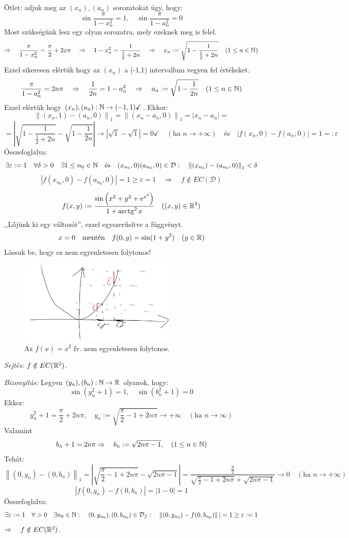 \documentclass[a4paper,11.5pt]{article}
\DeclareMathOperator{\arctg}{arc tg}
\newcommand{\norm}[1]{\left\lVert#1\right\rVert}
\begin{document}
\begin{task}
		Ötlet: adjuk meg az $(x_n),(a_n)$ sorozatokat úgy, hogy:
		\[ \sin\frac{\pi}{1-x_n^2}=1,\quad \sin\frac{\pi}{1-a_n^2}=0 \]
		Most szükségünk lesz egy olyan sorozatra, mely ezeknek meg is felel.
		\[ \Rightarrow\quad \frac{\pi}{1-x_n^2}=\frac{\pi}{2}+2x\pi \quad \Rightarrow\quad 1-x_n^2=\frac{1}{\frac{1}{2}+2n}\quad \Rightarrow\quad x_n:=\sqrt{1-\frac{1}{\frac{1}{2}+2n}}\quad (1\leq n\in\mathbb{N})  \]
		Ezzel sikeresen elértük hogy az $(x_n)$ a (-1,1) intervallum vegyen fel értékeket.
		\[ \frac{\pi}{1-a_n^2}=2n\pi\quad \Rightarrow\quad \frac{1}{2n}=1-a_n^2\quad \Rightarrow\quad a_n:=\sqrt{1-\frac{1}{2n}}\quad (1\leq n\in\mathbb{N}) \]
		Ezzel elértük hogy $(x_n),(a_n):\mathbb{N}\to(-1,1)\checkmark$. Ekkor:
		\[ \norm{(x_n,1)-(a_n,0)}_1=\norm{(x_n-a_n,0)}_1=|x_n-a_n|=\]
		\[=\left|\sqrt{1-\frac{1}{\frac{1}{2}+2n}}-\sqrt{1-\frac{1}{2n}}\right|\to|\sqrt{1}-\sqrt{1}|=0\checkmark\quad (\text{ha } n\to+\infty )\quad \text{és}\quad |f(x_n,0)-f(a_n,0)|=1=:\varepsilon \]
		Összefoglalva:
		\[ \exists\varepsilon:=1\quad \forall\delta>0\quad \exists1\leq n_0\in\N\quad \text{és}\quad (x_{n_0},0)(a_{n_0},0)\in \mathcal{D}:\quad \norm{(x_{n_0})-(a_{n_0},0)}_1<\delta\]
		\[ |f(x_{n_0},0)-f(a_{n_0},0)|=1 \geq\varepsilon=1\quad \Rightarrow\quad f\notin EC(\mathcal{D}) \]
		
	\end{task}
	\begin{task}
		\[ f(x,y):=\frac{\sin\left(x^2+y^2+e^{x^4}\right)}{1+\arctg^2x}\quad ((x,y)\in\R^2) \]
		,,Lőjünk ki egy változót'', ezzel egyszerűsítve a függvényt.
		\[ x=0\quad \text{mentén}\quad f(0,y)=\sin(1+y^2)\quad (y\in\mathbb{R}) \]
		Lássuk be, hogy ez nem egyenletesen folytonos!
		
		\begin{figure}[H]
			\centering
			\includegraphics[height=4cm]{../2zh/kepek/54.png}
			\caption{Az $f(x)=x^2$ fv. nem egyenletesen folytonos.}
		\end{figure}
		
		\textit{Sejtés:} $f\notin EC(\mathbb{R}^2)$.
		
		\textit{Bizonyítás:} Legyen $(y_n),(b_n):\mathbb{N}\to\mathbb{R}$ olyanok, hogy:
		\[ \sin(y_n^2+1)=1,\quad \sin(b_n^2+1)=0 \]
		Ekkor:
		\[ y_n^2+1=\frac{\pi}{2}+2n\pi,\quad y_n:=\sqrt{\frac{\pi}{2}-1+2n\pi}\to+\infty\quad (\text{ha }n\to\infty) \]
		Valamint
		\[ b_n+1=2n\pi\Rightarrow\quad b_n:=\sqrt{2n\pi-1},\quad (1\leq n\in\mathbb{N}) \]
		Tehát:
		\[ \norm{(0,y_n)-(0,b_n)}_1=\left|\sqrt{\frac{\pi}{2}-1+2n\pi}-\sqrt{2n\pi-1}\right|=\frac{\frac{\pi}{2}}{\sqrt{\frac{\pi}{2}-1+2n\pi}+\sqrt{2n\pi-1}}\to0\quad (\text{ha }n\to+\infty) \]
		\[ |f(0,y_n)-f(0,b_n)|=|1-0|=1 \]
		Összefoglalva:
		\[ \exists\varepsilon:=1\quad \forall>0\quad \exists n_0\in\N:\quad (0,y_{n_0}),(0,b_{n_0})\in\mathcal{D}_f:\quad \norm{(0,y_{n_0})-f(0,b_{n_0})}|=1\geq\varepsilon:=1 \]
		$\Rightarrow\quad f\notin EC(\mathbb{R}^2)$.
	\end{task}
\end{document}
